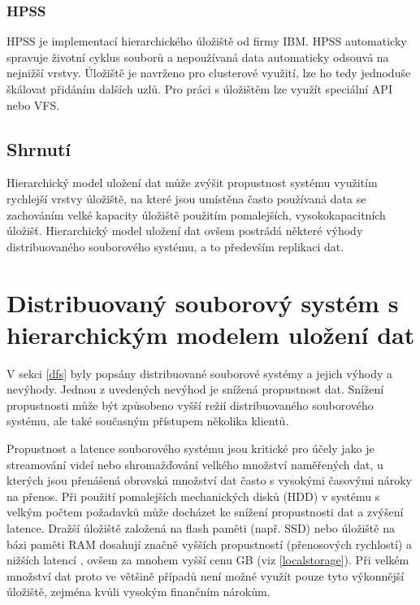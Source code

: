 \documentclass[czech,DP]{thesiskiv}
\begin{document}
\subsubsection*{HPSS}

HPSS \cite{hpssonline} je implementací hierarchického úložiště od firmy IBM. HPSS automaticky spravuje životní cyklus souborů a nepoužívaná data automaticky odsouvá na nejnižší vrstvy. Úložiště je navrženo pro clusterové využití, lze ho tedy jednoduše škálovat přidáním dalších uzlů. Pro práci s úložištěm lze využít speciální API nebo VFS.

\subsection{Shrnutí}

Hierarchický model uložení dat může zvýšit propustnost systému využitím rychlejší vrstvy úložiště, na které jsou umístěna často používaná data se zachováním velké kapacity úložiště použitím pomalejších, vysokokapacitních úložišť. Hierarchický model uložení dat ovšem postrádá některé výhody distribuovaného souborového systému, a to především replikaci dat. 

\section{Distribuovaný souborový systém s hierarchickým modelem uložení dat}

V sekci \ref{dfs} byly popsány distribuované souborové systémy a jejich výhody a nevýhody. Jednou z uvedených nevýhod je snížená propustnost dat. Snížení propustnosti může být způsobeno vyšší režií distribuovaného souborového systému, ale také současným přístupem několika klientů. 

Propustnost a latence souborového systému jsou kritické pro účely jako je streamování videí nebo shromažďování velkého množství naměřených dat, u kterých jsou přenášená obrovská množství dat často s vysokými časovými nároky na přenos. Při použití pomalejších mechanických disků (HDD) v systému s velkým počtem požadavků může docházet ke snížení propustnosti dat a zvýšení latence. Dražší úložiště založená na flash paměti (např. SSD) nebo úložiště na bázi paměti RAM dosahují značně vyšších propustností (přenosových rychlostí) a nižších latencí \cite{sniassdhdd}, ovšem za mnohem vyšší cenu GB (viz \ref{localstorage}). Při velkém množství dat proto ve většině případů není možné využít pouze tyto výkonnější úložiště, zejména kvůli vysokým finančním nárokům. 
\end{document}
